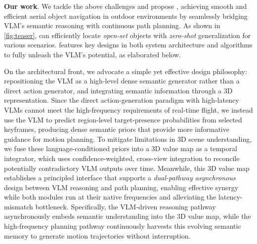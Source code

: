 \textbf{Our work}. We tackle the above challenges and propose \sysname, achieving smooth and efficient aerial object navigation in outdoor environments by seamlessly bridging VLM's semantic reasoning with continuous path planning. As shown in \fig\ref{fig:teaser}, \sysname can efficiently locate \textit{open-set} objects with \textit{zero-shot} generalization for various scenarios. \sysname features key designs in both system architecture and algorithms to fully unleash the VLM's potential, as elaborated below.


On the architectural front, we advocate a simple yet effective design philosophy: repositioning the VLM as a high-level dense semantic generator rather than a direct action generator, and integrating semantic information through a 3D representation. 
Since the direct action-generation paradigm with high-latency VLMs cannot meet the high-frequency requirements of real-time flight, we instead use the VLM to predict region-level target-presence probabilities from selected keyframes, producing dense semantic priors that provide more informative guidance for motion planning.
To mitigate limitations in 3D scene understanding, we fuse these language-conditioned priors into a 3D value map as a temporal integrator, which uses confidence-weighted, cross-view integration to reconcile potentially contradictory VLM outputs over time.
Meanwhile, this 3D value map establishes a principled interface that supports a \textit{dual-pathway asynchronous} design between VLM reasoning and path planning, enabling effective synergy while both modules run at their native frequencies and alleviating the latency-mismatch bottleneck.
Specifically, the VLM-driven reasoning pathway asynchronously embeds semantic understanding into the 3D value map, while the high-frequency planning pathway continuously harvests this evolving semantic memory to generate motion trajectories without interruption.


